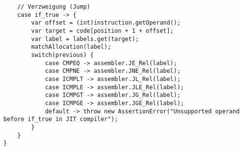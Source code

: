 \begin{lstlisting}
    // Verzweigung (Jump)
    case if_true -> {
        var offset = (int)instruction.getOperand();
        var target = code[position + 1 + offset];
        var label = labels.get(target);
        matchAllocation(label);
        switch(previous) {
            case CMPEQ -> assembler.JE_Rel(label);
            case CMPNE -> assembler.JNE_Rel(label);
            case ICMPLT -> assembler.JL_Rel(label);
            case ICMPLE -> assembler.JLE_Rel(label);
            case ICMPGT -> assembler.JG_Rel(label);
            case ICMPGE -> assembler.JGE_Rel(label);
            default -> throw new AssertionError("Unsupported operand before if_true in JIT compiler");
        }
    }
}
\end{lstlisting}